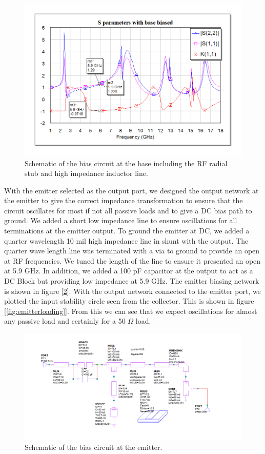 \documentclass{article}
\begin{document}
\begin{figure}[!htbp]
    \centering
    \includegraphics[scale=0.4]{base_biased_S_params.png}
    \caption{Schematic of the bias circuit at the base including the RF radial stub and high impedance inductor line.}
    \label{fig:collvsemit}
\end{figure}

With the emitter selected as the output port, we designed the output network at the emitter to give the correct impedance transformation to ensure that the circuit oscillates for most if not all passive loads and to give a DC bias path to ground. We added a short low impedance line to ensure oscillations for all terminations at the emitter output. To ground the emitter at DC, we added a quarter wavelength 10 mil high impedance line in shunt with the output. The quarter wave length line was terminated with a via to ground to provide an open at RF frequencies. We tuned the length of the line to ensure it presented an open at 5.9 GHz. In addition, we added a 100 pF capacitor at the output to act as a DC Block but providing low impedance at 5.9 GHz. The emitter biasing network is shown in figure [\ref{fig:emitterbias}]. With the output network connected to the emitter port, we plotted the input stability circle seen from the collector. This is shown in figure [\ref{fig:emitterloading}]. From this we can see that we expect oscillations for almost any passive load and certainly for a 50 $\Omega$ load.

\begin{figure}[!htbp]
    \centering
    \includegraphics[scale=0.4]{emitter_biasing.png}
    \caption{Schematic of the bias circuit at the emitter.}
    \label{fig:emitterbias}
\end{figure}
\end{document}
